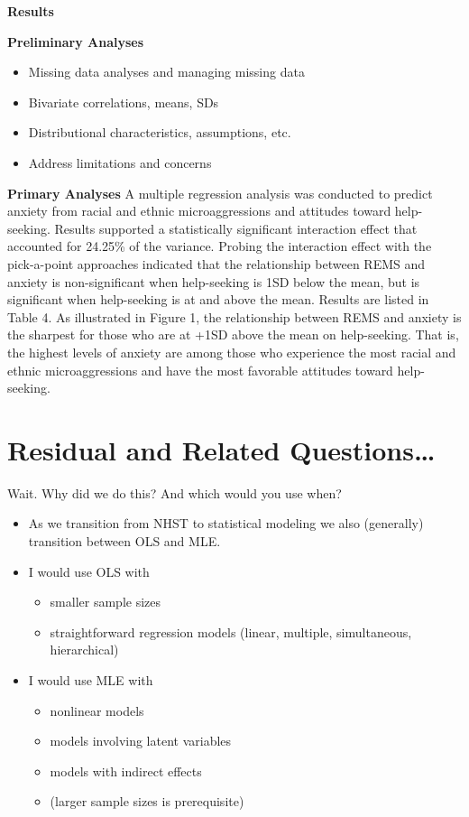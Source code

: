 \documentclass[
  11pt,
]{book}
\providecommand{\tightlist}{%
  \setlength{\itemsep}{0pt}\setlength{\parskip}{0pt}}
\begin{document}
\textbf{Results}

\textbf{Preliminary Analyses}

\begin{itemize}
\tightlist
\item
  Missing data analyses and managing missing data
\item
  Bivariate correlations, means, SDs
\item
  Distributional characteristics, assumptions, etc.
\item
  Address limitations and concerns
\end{itemize}

\textbf{Primary Analyses}
A multiple regression analysis was conducted to predict anxiety from racial and ethnic microaggressions and attitudes toward help-seeking. Results supported a statistically significant interaction effect that accounted for 24.25\% of the variance. Probing the interaction effect with the pick-a-point approaches indicated that the relationship between REMS and anxiety is non-significant when help-seeking is 1SD below the mean, but is significant when help-seeking is at and above the mean. Results are listed in Table 4. As illustrated in Figure 1, the relationship between REMS and anxiety is the sharpest for those who are at +1SD above the mean on help-seeking. That is, the highest levels of anxiety are among those who experience the most racial and ethnic microaggressions and have the most favorable attitudes toward help-seeking.

\hypertarget{residual-and-related-questions-1}{%
\section{Residual and Related Questions\ldots{}}\label{residual-and-related-questions-1}}

Wait. Why did we do this? And which would you use when?

\begin{itemize}
\tightlist
\item
  As we transition from NHST to statistical modeling we also (generally) transition between OLS and MLE.
\item
  I would use OLS with

  \begin{itemize}
  \tightlist
  \item
    smaller sample sizes
  \item
    straightforward regression models (linear, multiple, simultaneous, hierarchical)
  \end{itemize}
\item
  I would use MLE with

  \begin{itemize}
  \tightlist
  \item
    nonlinear models
  \item
    models involving latent variables
  \item
    models with indirect effects
  \item
    (larger sample sizes is prerequisite)
  \end{itemize}
\end{itemize}
\end{document}
